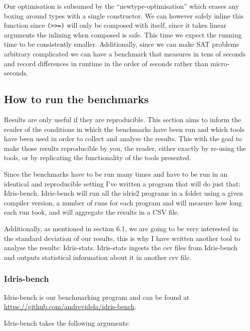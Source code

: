 \documentclass[
]{article}
\begin{document}
Our optimisation is subsumed by the ``newtype-optimisation'' which
erases any boxing around types with a single constructor. We can however
safely inline this function since
\texttt{(\textgreater{}\textgreater{}=)} will only be composed with
itself, since it takes linear arguments the inlining when composed is
safe. This time we expect the running time to be consistently smaller.
Additionally, since we can make SAT problems arbitrary complicated we
can have a benchmark that measures in tens of seconds and record
differences in runtime in the order of seconds rather than
micro-seconds.

\hypertarget{how-to-run-the-benchmarks}{%
\subsection{How to run the benchmarks}\label{how-to-run-the-benchmarks}}

Results are only useful if they are reproducible. This section aims to
inform the reader of the conditions in which the benchmarks have been
run and which tools have been used in order to collect and analyse the
results. This with the goal to make those results reproducible by you,
the reader, either exactly by re-using the tools, or by replicating the
functionality of the tools presented.

Since the benchmarks have to be run many times and have to be run in an
identical and reproducible setting I've written a program that will do
just that: Idris-bench. Idris-bench will run all the idris2 programs in
a folder using a given compiler version, a number of runs for each
program and will measure how long each run took, and will aggregate the
results in a CSV file.

Additionally, as mentioned in section 6.1, we are going to be very
interested in the standard deviation of our results, this is why I have
written another tool to analyse the results: Idris-stats. Idris-stats
ingests the csv files from Idris-bench and outputs statistical
information about it in another csv file.

\hypertarget{idris-bench}{%
\subsubsection{Idris-bench}\label{idris-bench}}

Idris-bench is our benchmarking program and can be found at
\url{https://github.com/andrevidela/idris-bench}.

Idris-bench takes the following arguments:
\end{document}
